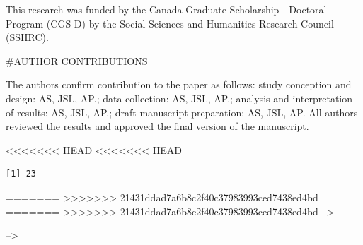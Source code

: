 \documentclass[]{trbunofficial}
\begin{document}
This research was funded by the Canada Graduate Scholarship - Doctoral
Program (CGS D) by the Social Sciences and Humanities Research Council
(SSHRC).

\#AUTHOR CONTRIBUTIONS

The authors confirm contribution to the paper as follows: study
conception and design: AS, JSL, AP.; data collection: AS, JSL, AP.;
analysis and interpretation of results: AS, JSL, AP.; draft manuscript
preparation: AS, JSL, AP. All authors reviewed the results and approved
the final version of the manuscript.

<<<<<<< HEAD
<<<<<<< HEAD
\begin{verbatim}
[1] 23
\end{verbatim}

=======
>>>>>>> 21431ddad7a6b8c2f40c37983993ced7438ed4bd
=======
>>>>>>> 21431ddad7a6b8c2f40c37983993ced7438ed4bd
--\textgreater{}

--\textgreater{}

\newpage

\end{document}

